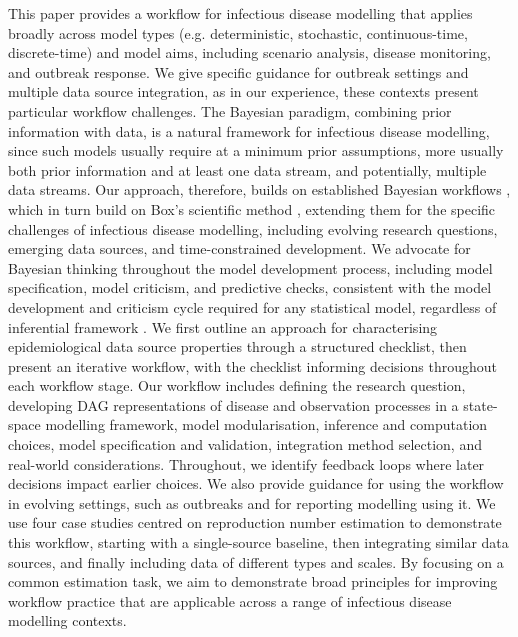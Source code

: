 \documentclass{article}
\begin{document}
This paper provides a workflow for infectious disease modelling that applies broadly across model types (e.g. deterministic, stochastic, continuous-time, discrete-time) and model aims, including scenario analysis, disease monitoring, and outbreak response. We give specific guidance for outbreak settings and multiple data source integration, as in our experience, these contexts present particular workflow challenges.
The Bayesian paradigm, combining prior information with data, is a natural framework for infectious disease modelling, since such models usually require at a minimum prior assumptions, more usually both prior information and at least one data stream, and potentially, multiple data streams. Our approach, therefore, builds on established Bayesian workflows \citep{green2003highly,gelman2020bayesian}, which in turn build on Box's scientific method \citep{box1979robustness,Box1980}, extending them for the specific challenges of infectious disease modelling, including evolving research questions, emerging data sources, and time-constrained development.
We advocate for Bayesian thinking throughout the model development process, including model specification, model criticism, and predictive checks, consistent with the model development and criticism cycle required for any statistical model, regardless of inferential framework \citep{box1979robustness}.
We first outline an approach for characterising epidemiological data source properties through a structured checklist, then present an iterative workflow, with the checklist informing decisions throughout each workflow stage.
Our workflow includes defining the research question, developing \ac{DAG} representations of disease and observation processes in a state-space modelling framework, model modularisation, inference and computation choices, model specification and validation, integration method selection, and real-world considerations.
Throughout, we identify feedback loops where later decisions impact earlier choices.
We also provide guidance for using the workflow in evolving settings, such as outbreaks and for reporting modelling using it.
We use four case studies centred on reproduction number estimation to demonstrate this workflow, starting with a single-source baseline, then integrating similar data sources, and finally including data of different types and scales.
By focusing on a common estimation task, we aim to demonstrate broad principles for improving workflow practice that are applicable across a range of infectious disease modelling contexts.
\end{document}
